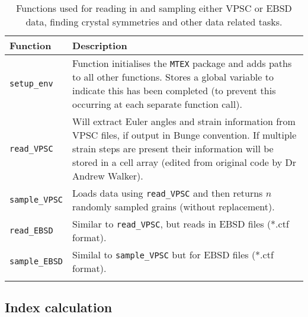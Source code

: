 \documentclass[a4paper,12pt,twoside]{report}
\numberwithin{equation}{chapter}
\begin{document}
\begin{table}[h!] 
	\centering
	\caption[Functions: reading \& sampling]{Functions used for reading in and sampling either VPSC or EBSD data, finding crystal symmetries and other data related tasks.}
	\noindent
	
\begin{tabularx}{\textwidth}{lX}

\hline
\hline
Function    & Description   \\ 
\hline
\hline

\texttt{setup\_{}env} & Function initialises the \texttt{MTEX} package and adds paths to all other functions. Stores a global variable to indicate this has been completed (to prevent this occurring at each separate function call). \\  

\texttt{read\_{}VPSC} & Will extract Euler angles and strain information from VPSC files, if output in Bunge convention. If multiple strain steps are present their information will be stored in a cell array (edited from original code by Dr Andrew Walker). \\ 

\texttt{sample\_{}VPSC} & Loads data using \texttt{read\_{}VPSC} and then returns $n$ randomly sampled grains (without replacement). \\  

\texttt{read\_{}EBSD} & Similar to \texttt{read\_{}VPSC}, but reads in EBSD files (*.ctf format). \\

\texttt{sample\_{}EBSD} & Similal to \texttt{sample\_{}VPSC} but for EBSD files (*.ctf format). \\ 
\\
\hline
\hline

\end{tabularx}
\label{tab:read_functions}
\end{table}

\subsection{Index calculation} \label{sec:index_calc}
\end{document}
